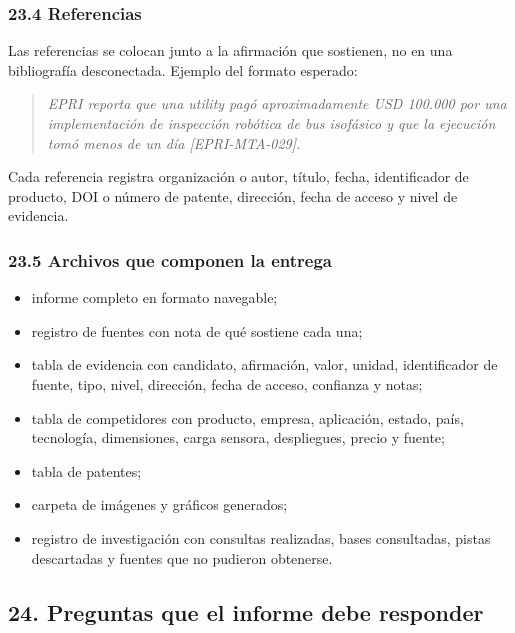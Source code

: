 \documentclass[11pt,a4paper]{article}
\begin{document}
\subsubsection*{23.4 Referencias}

Las referencias se colocan junto a la afirmación que sostienen, no en una bibliografía desconectada. Ejemplo del formato esperado:

\begin{quote}\itshape EPRI reporta que una utility pagó aproximadamente USD 100.000 por una implementación de inspección robótica de bus isofásico y que la ejecución tomó menos de un día [EPRI-MTA-029].\end{quote}
Cada referencia registra organización o autor, título, fecha, identificador de producto, DOI o número de patente, dirección, fecha de acceso y nivel de evidencia.


\subsubsection*{23.5 Archivos que componen la entrega}

\begin{itemize}
\item informe completo en formato navegable;
\item registro de fuentes con nota de qué sostiene cada una;
\item tabla de evidencia con candidato, afirmación, valor, unidad, identificador de fuente, tipo, nivel, dirección, fecha de acceso, confianza y notas;
\item tabla de competidores con producto, empresa, aplicación, estado, país, tecnología, dimensiones, carga sensora, despliegues, precio y fuente;
\item tabla de patentes;
\item carpeta de imágenes y gráficos generados;
\item registro de investigación con consultas realizadas, bases consultadas, pistas descartadas y fuentes que no pudieron obtenerse.
\end{itemize}


\subsection*{24. Preguntas que el informe debe responder}
\end{document}
